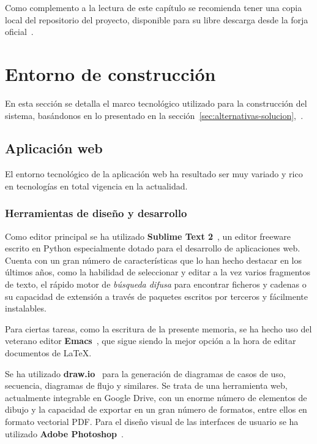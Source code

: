 Como complemento a la lectura de este capítulo se recomienda tener una copia
local del repositorio del proyecto, disponible para su libre descarga desde la
forja oficial~\cite{forja}.

\section{Entorno de construcción}

En esta sección se detalla el marco tecnológico utilizado para la construcción
del sistema, basándonos en lo presentado en la
sección~\ref{sec:alternativas-solucion},\textit{~}.

\subsection{Aplicación web}

El entorno tecnológico de la aplicación web ha resultado ser muy variado y rico
en tecnologías en total vigencia en la actualidad. 

\subsubsection{Herramientas de diseño y desarrollo}

Como editor principal se ha utilizado \textbf{Sublime Text
  2}~\cite{sublime-text}, un editor freeware escrito en Python especialmente
dotado para el desarrollo de aplicaciones web. Cuenta con un gran número de
características que lo han hecho destacar en los últimos años, como la habilidad
de seleccionar y editar a la vez varios fragmentos de texto, el rápido motor de
\textit{búsqueda difusa} para encontrar ficheros y cadenas o su capacidad de
extensión a través de paquetes escritos por terceros y fácilmente instalables.

Para ciertas tareas, como la escritura de la presente memoria, se ha hecho uso
del veterano editor \textbf{Emacs}~\cite{emacs}, que sigue siendo la mejor
opción a la hora de editar documentos de \LaTeX. 

Se ha utilizado \textbf{draw.io}~\cite{draw.io} para la generación de diagramas
de casos de uso, secuencia, diagramas de flujo y similares. Se trata de una
herramienta web, actualmente integrable en Google Drive, con un enorme número de
elementos de dibujo y la capacidad de exportar en un gran número de formatos,
entre ellos en formato vectorial \ac{PDF}. Para el diseño visual de las
interfaces de usuario se ha utilizado \textbf{Adobe Photoshop}~\cite{photoshop}.

